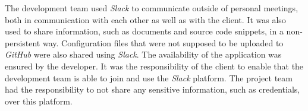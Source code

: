 The development team used \textit{Slack} to communicate outside of personal meetings, both in communication with each other as well as with the client. It was also used to share information, such as documents and source code snippets, in a non-persistent way. Configuration files that were not supposed to be uploaded to \textit{GitHub} were also shared using \textit{Slack}.
\newline
The availability of the application was ensured by the developer. It was the responsibility of the client to enable that the development team is able to join and use the \textit{Slack} platform. The project team had the responsibility to not share any sensitive information, such as credentials, over this platform.